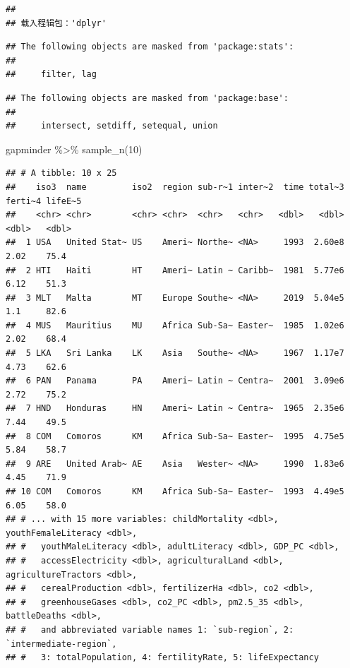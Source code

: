 \documentclass[
]{article}
\newenvironment{Shaded}{\begin{snugshade}}{\end{snugshade}}
\newcommand{\DecValTok}[1]{\textcolor[rgb]{0.00,0.00,0.81}{#1}}
\newcommand{\FunctionTok}[1]{\textcolor[rgb]{0.00,0.00,0.00}{#1}}
\newcommand{\NormalTok}[1]{#1}
\newcommand{\SpecialCharTok}[1]{\textcolor[rgb]{0.00,0.00,0.00}{#1}}
\begin{document}
\begin{verbatim}
## 
## 载入程辑包：'dplyr'
\end{verbatim}

\begin{verbatim}
## The following objects are masked from 'package:stats':
## 
##     filter, lag
\end{verbatim}

\begin{verbatim}
## The following objects are masked from 'package:base':
## 
##     intersect, setdiff, setequal, union
\end{verbatim}

\begin{Shaded}
\begin{Highlighting}[]
\NormalTok{gapminder }\SpecialCharTok{\%\textgreater{}\%} \FunctionTok{sample\_n}\NormalTok{(}\DecValTok{10}\NormalTok{)}
\end{Highlighting}
\end{Shaded}

\begin{verbatim}
## # A tibble: 10 x 25
##    iso3  name         iso2  region sub-r~1 inter~2  time total~3 ferti~4 lifeE~5
##    <chr> <chr>        <chr> <chr>  <chr>   <chr>   <dbl>   <dbl>   <dbl>   <dbl>
##  1 USA   United Stat~ US    Ameri~ Northe~ <NA>     1993  2.60e8    2.02    75.4
##  2 HTI   Haiti        HT    Ameri~ Latin ~ Caribb~  1981  5.77e6    6.12    51.3
##  3 MLT   Malta        MT    Europe Southe~ <NA>     2019  5.04e5    1.1     82.6
##  4 MUS   Mauritius    MU    Africa Sub-Sa~ Easter~  1985  1.02e6    2.02    68.4
##  5 LKA   Sri Lanka    LK    Asia   Southe~ <NA>     1967  1.17e7    4.73    62.6
##  6 PAN   Panama       PA    Ameri~ Latin ~ Centra~  2001  3.09e6    2.72    75.2
##  7 HND   Honduras     HN    Ameri~ Latin ~ Centra~  1965  2.35e6    7.44    49.5
##  8 COM   Comoros      KM    Africa Sub-Sa~ Easter~  1995  4.75e5    5.84    58.7
##  9 ARE   United Arab~ AE    Asia   Wester~ <NA>     1990  1.83e6    4.45    71.9
## 10 COM   Comoros      KM    Africa Sub-Sa~ Easter~  1993  4.49e5    6.05    58.0
## # ... with 15 more variables: childMortality <dbl>, youthFemaleLiteracy <dbl>,
## #   youthMaleLiteracy <dbl>, adultLiteracy <dbl>, GDP_PC <dbl>,
## #   accessElectricity <dbl>, agriculturalLand <dbl>, agricultureTractors <dbl>,
## #   cerealProduction <dbl>, fertilizerHa <dbl>, co2 <dbl>,
## #   greenhouseGases <dbl>, co2_PC <dbl>, pm2.5_35 <dbl>, battleDeaths <dbl>,
## #   and abbreviated variable names 1: `sub-region`, 2: `intermediate-region`,
## #   3: totalPopulation, 4: fertilityRate, 5: lifeExpectancy
\end{verbatim}
\end{document}
